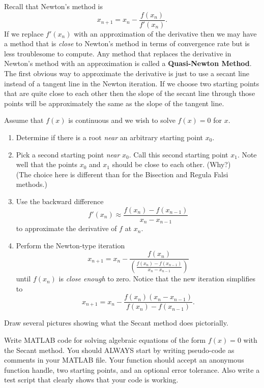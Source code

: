 Recall that Newton's method is
\[ x_{n+1} = x_n - \frac{f(x_n)}{f'(x_n)}. \]
If we replace $f'(x_n)$ with an approximation of the derivative then we may have a method
that is {\it close} to Newton's method in terms of convergence rate but is less
troublesome to compute. Any method that replaces the derivative in Newton's method with an
approximation is called a {\bf Quasi-Newton Method}.  The first obvious way to approximate
the derivative is just to use a secant line instead of a tangent line in the Newton
iteration.  If we choose two starting points that are quite close to each other then the
slope of the secant line through those points will be approximately the same as the slope
of the tangent line.  

\begin{algorithm}
    Assume that $f(x)$ is continuous and we wish to solve $f(x) = 0$ for $x$.
    \begin{enumerate}
        \item Determine if there is a root {\it near} an arbitrary starting point $x_0$.
        \item Pick a second starting point {\it near} $x_0$.  Call this second starting
            point $x_1$. Note well that the points $x_0$ and
            $x_1$ should be close to each other. (Why?)\\ (The choice here is different than for
            the Bisection  and Regula Falsi methods.)
        \item Use the backward difference 
            \[ f'(x_n) \approx \frac{f(x_n) - f(x_{n-1})}{x_n - x_{n-1}} \]
            to approximate the derivative of $f$ at $x_n$.
        \item Perform the Newton-type iteration 
            \[ x_{n+1} = x_n - \frac{f(x_n)}{ \left(  \frac{f(x_n) - f(x_{n-1})}{x_n - x_{n-1}}\right)} \]
            until $f(x_n)$ is {\it close enough} to zero.  Notice that the new iteration
            simplifies to
            \[ x_{n+1} = x_n - \frac{f(x_n)\left( x_n - x_{n-1} \right)}{f(x_n) -
            f(x_{n-1})}. \]
    \end{enumerate}
\end{algorithm}

\begin{problem}
    Draw several pictures showing what the Secant method does pictorially.
\end{problem}

\begin{problem}
    Write MATLAB code for solving algebraic equations of the form $f(x) = 0$ with the
    Secant method.  You should ALWAYS start by writing pseudo-code as comments in your
    MATLAB file.   Your function should accept an anonymous function handle, two starting
    points, and an optional error tolerance.  Also write a test script that clearly shows that your code is working.
    \\
\end{problem}

